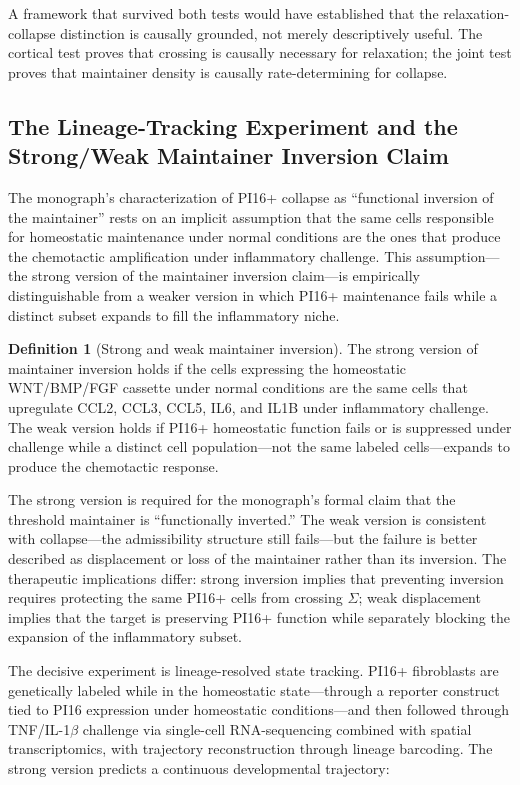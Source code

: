 \documentclass[12pt, a4paper]{article}
\theoremstyle{definition}
\newtheorem{defn}{Definition}[section]
\begin{document}
A framework that survived both tests would have established that the relaxation-collapse distinction is causally grounded, not merely descriptively useful. The cortical test proves that crossing is causally necessary for relaxation; the joint test proves that maintainer density is causally rate-determining for collapse.

\subsection{The Lineage-Tracking Experiment and the Strong/Weak Maintainer Inversion Claim}

The monograph's characterization of PI16+ collapse as ``functional inversion of the maintainer'' rests on an implicit assumption that the same cells responsible for homeostatic maintenance under normal conditions are the ones that produce the chemotactic amplification under inflammatory challenge. This assumption---the strong version of the maintainer inversion claim---is empirically distinguishable from a weaker version in which PI16+ maintenance fails while a distinct subset expands to fill the inflammatory niche.

\begin{defn}[Strong and weak maintainer inversion]
The strong version of maintainer inversion holds if the cells expressing the homeostatic WNT/BMP/FGF cassette under normal conditions are the same cells that upregulate CCL2, CCL3, CCL5, IL6, and IL1B under inflammatory challenge. The weak version holds if PI16+ homeostatic function fails or is suppressed under challenge while a distinct cell population---not the same labeled cells---expands to produce the chemotactic response.
\end{defn}

The strong version is required for the monograph's formal claim that the threshold maintainer is ``functionally inverted.'' The weak version is consistent with collapse---the admissibility structure still fails---but the failure is better described as displacement or loss of the maintainer rather than its inversion. The therapeutic implications differ: strong inversion implies that preventing inversion requires protecting the same PI16+ cells from crossing $\Sigma$; weak displacement implies that the target is preserving PI16+ function while separately blocking the expansion of the inflammatory subset.

The decisive experiment is lineage-resolved state tracking. PI16+ fibroblasts are genetically labeled while in the homeostatic state---through a reporter construct tied to PI16 expression under homeostatic conditions---and then followed through TNF/IL-1$\beta$ challenge via single-cell RNA-sequencing combined with spatial transcriptomics, with trajectory reconstruction through lineage barcoding. The strong version predicts a continuous developmental trajectory:
\end{document}
